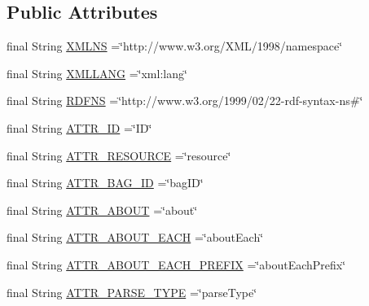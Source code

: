 \subsection*{Public Attributes}
\begin{DoxyCompactItemize}
\item 
final String \hyperlink{interfaceorg_1_1semanticweb_1_1owlapi_1_1rdf_1_1util_1_1_r_d_f_constants_af868d50a0e51fcafef24fefb459841d6}{X\-M\-L\-N\-S} =\char`\"{}http\-://www.\-w3.\-org/X\-M\-L/1998/namespace\char`\"{}
\item 
final String \hyperlink{interfaceorg_1_1semanticweb_1_1owlapi_1_1rdf_1_1util_1_1_r_d_f_constants_a634281bcd76d08878ede58285fb11761}{X\-M\-L\-L\-A\-N\-G} =\char`\"{}xml\-:lang\char`\"{}
\item 
final String \hyperlink{interfaceorg_1_1semanticweb_1_1owlapi_1_1rdf_1_1util_1_1_r_d_f_constants_a556ae4a915be475055839e49b1e5a067}{R\-D\-F\-N\-S} =\char`\"{}http\-://www.\-w3.\-org/1999/02/22-\/rdf-\/syntax-\/ns\#\char`\"{}
\item 
final String \hyperlink{interfaceorg_1_1semanticweb_1_1owlapi_1_1rdf_1_1util_1_1_r_d_f_constants_a881a332f72df4d442cf7503e17e3dcee}{A\-T\-T\-R\-\_\-\-I\-D} =\char`\"{}I\-D\char`\"{}
\item 
final String \hyperlink{interfaceorg_1_1semanticweb_1_1owlapi_1_1rdf_1_1util_1_1_r_d_f_constants_a000bd2a10377d7ed73cc74797b649902}{A\-T\-T\-R\-\_\-\-R\-E\-S\-O\-U\-R\-C\-E} =\char`\"{}resource\char`\"{}
\item 
final String \hyperlink{interfaceorg_1_1semanticweb_1_1owlapi_1_1rdf_1_1util_1_1_r_d_f_constants_a15380036e9ac73bb41fc3494aa1d9036}{A\-T\-T\-R\-\_\-\-B\-A\-G\-\_\-\-I\-D} =\char`\"{}bag\-I\-D\char`\"{}
\item 
final String \hyperlink{interfaceorg_1_1semanticweb_1_1owlapi_1_1rdf_1_1util_1_1_r_d_f_constants_a03eeb3ce86a68923ea60703783c91d63}{A\-T\-T\-R\-\_\-\-A\-B\-O\-U\-T} =\char`\"{}about\char`\"{}
\item 
final String \hyperlink{interfaceorg_1_1semanticweb_1_1owlapi_1_1rdf_1_1util_1_1_r_d_f_constants_a2304a081e33f7d5b6ac793016fd5214a}{A\-T\-T\-R\-\_\-\-A\-B\-O\-U\-T\-\_\-\-E\-A\-C\-H} =\char`\"{}about\-Each\char`\"{}
\item 
final String \hyperlink{interfaceorg_1_1semanticweb_1_1owlapi_1_1rdf_1_1util_1_1_r_d_f_constants_a5596f680f1cefcf1b86f075d561935b6}{A\-T\-T\-R\-\_\-\-A\-B\-O\-U\-T\-\_\-\-E\-A\-C\-H\-\_\-\-P\-R\-E\-F\-I\-X} =\char`\"{}about\-Each\-Prefix\char`\"{}
\item 
final String \hyperlink{interfaceorg_1_1semanticweb_1_1owlapi_1_1rdf_1_1util_1_1_r_d_f_constants_a34e86d249487e2bd61ba8eb1b53dcdb9}{A\-T\-T\-R\-\_\-\-P\-A\-R\-S\-E\-\_\-\-T\-Y\-P\-E} =\char`\"{}parse\-Type\char`\"{}

\end{DoxyCompactItemize}
